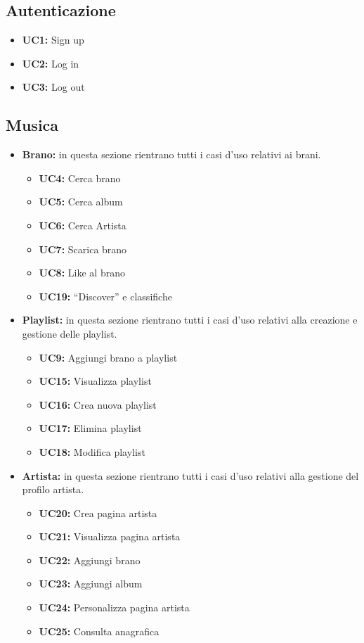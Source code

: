\subsection{\textbf{Autenticazione}}
    \begin{itemize}
        \item \textbf{UC1:} Sign up 
        \item \textbf{UC2:} Log in
        \item \textbf{UC3:} Log out 
    \end{itemize}


\subsection{\textbf{Musica}}
\begin{itemize}
    \item \textbf{Brano:} in questa sezione rientrano tutti i casi d'uso relativi ai brani.
    \begin{itemize}
        \item \textbf{UC4:} Cerca brano
        \item \textbf{UC5:} Cerca album
        \item \textbf{UC6:} Cerca Artista
        \item \textbf{UC7:} Scarica brano
        \item \textbf{UC8:} Like al brano
        \item \textbf{UC19:} ``Discover'' e classifiche
    \end{itemize} 
    
    \item \textbf{Playlist:} in questa sezione rientrano tutti i casi d'uso relativi alla creazione e gestione delle playlist.
    \begin{itemize}
        \item \textbf{UC9:} Aggiungi brano a playlist
        \item \textbf{UC15:} Visualizza playlist 
        \item \textbf{UC16:} Crea nuova playlist 
        \item \textbf{UC17:} Elimina playlist
        \item \textbf{UC18:} Modifica playlist
    \end{itemize}
    
    \item \textbf{Artista:} in questa sezione rientrano tutti i casi d'uso relativi alla gestione del profilo artista.
    \begin{itemize}
        \item  \textbf{UC20:} Crea pagina artista 
        \item  \textbf{UC21:} Visualizza pagina artista 
        \item  \textbf{UC22:} Aggiungi brano 
        \item  \textbf{UC23:} Aggiungi album 
        \item  \textbf{UC24:} Personalizza pagina artista 
        \item  \textbf{UC25:} Consulta anagrafica
    \end{itemize} 
\end{itemize}

